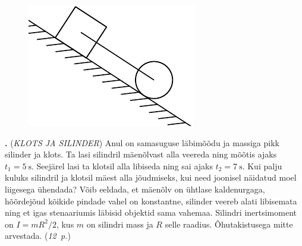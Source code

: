\documentclass[11pt,a5paper]{article}
\newcommand{\numb}[1]{\vspace{5pt}\textbf{\large #1}}
\newcommand{\nimi}[1]{(\textsl{\small #1})}
\newcommand{\punktid}[1]{(\emph{#1~p.})}
\newcounter{ylesanne}
\newcommand{\yl}[1]{\addtocounter{ylesanne}{1}\numb{\theylesanne.} \nimi{#1} \newblock{}}
\newcommand{\autor}[1]{}%
\begin{document}
\newpage
\begin{figure}
    \vspace{-25pt}
    \begin{center}
        \includegraphics[width=\linewidth]{klots-silinder}
    \end{center}
\end{figure}
\yl{KLOTS JA SILINDER}
Anul on samasuguse läbimõõdu ja massiga pikk silinder ja klots. Ta lasi silindril mäenõlvast alla veereda ning mõõtis ajaks $t_1 = \SI{5}{\second}$. Seejärel lasi ta klotsil alla libiseda ning sai ajaks $t_2 = \SI{7}{\second}$. Kui palju kuluks silindril ja klotsil mäest alla jõudmiseks, kui need joonisel näidatud moel liigesega ühendada? Võib eeldada, et mäenõlv on ühtlase kaldenurgaga, hõõrdejõud kõikide pindade vahel on konstantne, silinder veereb alati libisemata ning et igas stenaariumis läbisid objektid sama vahemaa. Silindri inertsimoment on $I=mR^2/2$, kus $m$ on silindri mass ja $R$ selle raadius. Õhutakistusega mitte arvestada.
\punktid{12} \autor{Taavet Kalda}
\end{document}
